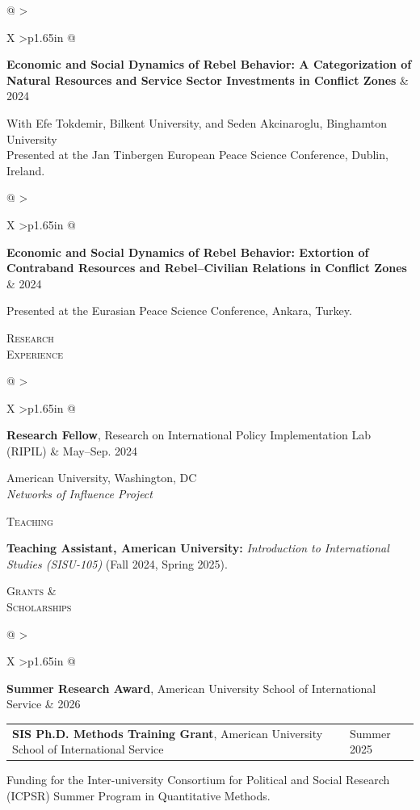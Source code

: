 \documentclass[10pt,letterpaper]{article}
\makeatletter
\newlength{\labelcol}
\newlength{\colgap}
\newcommand{\cvrow}[2]{%
  \noindent
  \begin{minipage}[t]{\labelcol}
    \vspace{0pt}
    \raggedright\textsc{#1}
  \end{minipage}%
  \hspace{\colgap}%
  \begin{minipage}[t]{%
    \dimexpr\textwidth-\labelcol-\colgap\relax
  }
    \vspace{0pt}
    \raggedright #2
  \end{minipage}\par
}
\newcommand{\datedline}[2]{%
  \noindent
  \begin{tabularx}{\linewidth}{%
    @{}
    >{\raggedright\arraybackslash}X
    >{\raggedleft\arraybackslash\small}p{1.65in}
    @{}
  }
    #1 & #2
  \end{tabularx}\par
}
\newcommand{\entrygap}{\vspace{0.75em}}
\newcommand{\sectiongap}{\vspace{1.30em}}
\makeatother
\begin{document}
\cvrow{}{%
  \datedline{%
    \textbf{Economic and Social Dynamics of Rebel Behavior:
    A Categorization of Natural Resources and Service Sector
    Investments in Conflict Zones}
  }{2024}

  With Efe Tokdemir, Bilkent University, and
  Seden Akcinaroglu, Binghamton University\\
  Presented at the Jan Tinbergen European Peace Science Conference,
  Dublin, Ireland.
}

\entrygap

\cvrow{}{%
  \datedline{%
    \textbf{Economic and Social Dynamics of Rebel Behavior:
    Extortion of Contraband Resources and Rebel--Civilian
    Relations in Conflict Zones}
  }{2024}

  Presented at the Eurasian Peace Science Conference,
  Ankara, Turkey.
}

\sectiongap


\cvrow{Research\\Experience}{%
  \datedline{%
    \textbf{Research Fellow},
    Research on International Policy Implementation Lab (RIPIL)
  }{May--Sep. 2024}

  American University, Washington, DC\\
  \textit{Networks of Influence Project}
}

\sectiongap


\cvrow{Teaching}{%
  \textbf{Teaching Assistant, American University:}
  \textit{Introduction to International Studies (SISU-105)}
  (Fall 2024, Spring 2025).
}

\sectiongap


\cvrow{Grants \&\\Scholarships}{%
  \datedline{%
    \textbf{Summer Research Award},
    American University School of International Service
  }{2026}
}

\entrygap

\cvrow{}{%
  \datedline{%
    \textbf{SIS Ph.D. Methods Training Grant},
    American University School of International Service
  }{Summer 2025}

  Funding for the Inter-university Consortium for Political and
  Social Research (ICPSR) Summer Program in Quantitative Methods.
}
\end{document}
